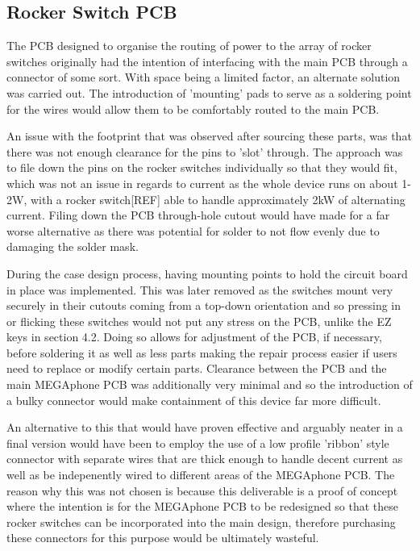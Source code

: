 \subsection{Rocker Switch PCB}

The PCB designed to organise the routing of power to the array of rocker switches originally had the intention of interfacing with the main PCB through a connector of some sort.
With space being a limited factor, an alternate solution was carried out.
The introduction of 'mounting' pads to serve as a soldering point for the wires would allow them to be comfortably routed to the main PCB.

An issue with the footprint that was observed after sourcing these parts, was that there was not enough clearance for the pins to 'slot' through.
The approach was to file down the pins on the rocker switches individually so that they would fit, which was not an issue in regards to current as the whole device runs on about 1-2W, with a rocker switch[REF] able to handle approximately 2kW of alternating current.
Filing down the PCB through-hole cutout would have made for a far worse alternative as there was potential for solder to not flow evenly due to damaging the solder mask. %

During the case design process, having mounting points to hold the circuit board in place was implemented.
This was later removed as the switches mount very securely in their cutouts coming from a top-down orientation and so pressing in or flicking these switches would not put any stress on the PCB, unlike the EZ keys in section 4.2.
Doing so allows for adjustment of the PCB, if necessary, before soldering it as well as less parts making the repair process easier if users need to replace or modify certain parts.
Clearance between the PCB and the main MEGAphone PCB was additionally very minimal and so the introduction of a bulky connector would make containment of this device far more difficult.

An alternative to this that would have proven effective and arguably neater in a final version would have been to employ the use of a low profile 'ribbon' style connector with separate wires that are thick enough to handle decent current as well as be indepenently wired to different areas of the MEGAphone PCB.
The reason why this was not chosen is because this deliverable is a proof of concept where the intention is for the MEGAphone PCB to be redesigned so that these rocker switches can be incorporated into the main design, therefore purchasing these connectors for this purpose would be ultimately wasteful.

